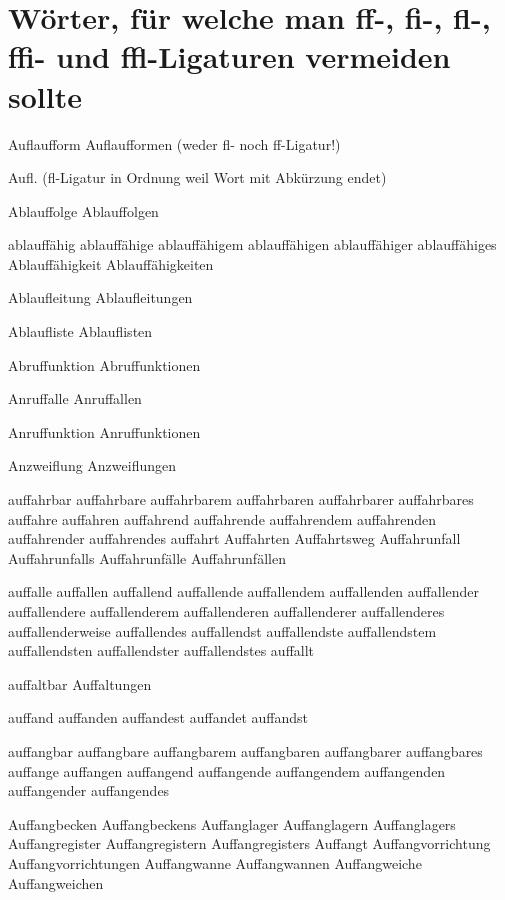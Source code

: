 


\section*{Wörter, für welche man ff-, fi-, fl-, ffi- und ffl-Ligaturen vermeiden sollte}

Auflaufform Auflaufformen (weder fl- noch ff-Ligatur!)

Aufl. (fl-Ligatur in Ordnung weil Wort mit Abkürzung endet)

\smallskip
Ablauffolge Ablauffolgen

ablauffähig ablauffähige ablauffähigem ablauffähigen ablauffähiger ablauffähiges Ablauffähigkeit Ablauffähigkeiten

Ablaufleitung Ablaufleitungen

Ablaufliste Ablauflisten

Abruffunktion Abruffunktionen

Anruffalle Anruffallen

Anruffunktion Anruffunktionen

Anzweiflung Anzweiflungen

auffahrbar auffahrbare auffahrbarem auffahrbaren auffahrbarer auffahrbares auffahre auffahren auffahrend auffahrende auffahrendem auffahrenden auffahrender auffahrendes auffahrt Auffahrten Auffahrtsweg Auffahrunfall Auffahrunfalls Auffahrunfälle Auffahrunfällen

auffalle auffallen auffallend auffallende auffallendem auffallenden auffallender auffallendere auffallenderem auffallenderen auffallenderer auffallenderes auffallenderweise auffallendes auffallendst auffallendste auffallendstem auffallendsten auffallendster auffallendstes auffallt

auffaltbar Auffaltungen

auffand auffanden auffandest auffandet auffandst

auffangbar auffangbare auffangbarem auffangbaren auffangbarer auffangbares auffange auffangen auffangend auffangende auffangendem auffangenden auffangender auffangendes 

Auffangbecken Auffangbeckens Auffanglager Auffanglagern Auffanglagers Auffangregister Auffangregistern Auffangregisters Auffangt Auffangvorrichtung Auffangvorrichtungen Auffangwanne Auffangwannen Auffangweiche Auffangweichen

